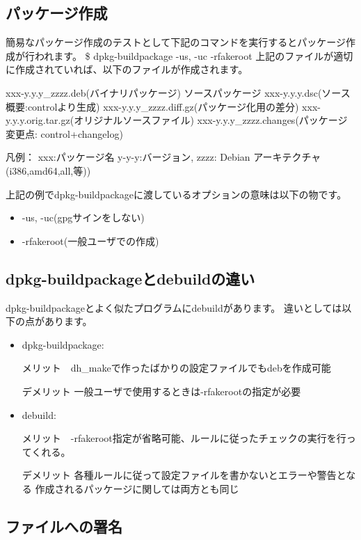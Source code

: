 \documentclass[mingoth,a4paper]{jsarticle}
\begin{document}
\subsection{パッケージ作成}

簡易なパッケージ作成のテストとして下記のコマンドを実行するとパッケージ作成が行われます。
\$ dpkg-buildpackage  -us, -uc  -rfakeroot
上記のファイルが適切に作成されていれば、以下のファイルが作成されます。
\begin{commandline}
 xxx-y.y.y_zzzz.deb(バイナリパッケージ)
 ソースパッケージ
 xxx-y.y.y.dsc(ソース概要:controlより生成)
 xxx-y.y.y_zzzz.diff.gz(パッケージ化用の差分)
 xxx-y.y.y.orig.tar.gz(オリジナルソースファイル)
 xxx-y.y.y_zzzz.changes(パッケージ変更点: control+changelog)

凡例： 
	xxx:パッケージ名
	y-y-y:バージョン,
	zzzz: Debian アーキテクチャ(i386,amd64,all,等))
\end{commandline}

上記の例でdpkg-buildpackageに渡しているオプションの意味は以下の物です。
\begin{itemize}
 \item  -us, -uc(gpgサインをしない)
 \item  -rfakeroot(一般ユーザでの作成)
\end{itemize}


\subsection{dpkg-buildpackageとdebuildの違い}

dpkg-buildpackageとよく似たプログラムにdebuildがあります。
違いとしては以下の点があります。

\begin{itemize}
 \item  dpkg-buildpackage:

 メリット　dh\_makeで作ったばかりの設定ファイルでもdebを作成可能

 デメリット 一般ユーザで使用するときは-rfakerootの指定が必要
 \item  debuild:

 メリット　-rfakeroot指定が省略可能、ルールに従ったチェックの実行を行っ
	てくれる。

 デメリット 各種ルールに従って設定ファイルを書かないとエラーや警告となる
 作成されるパッケージに関しては両方とも同じ
\end{itemize}


\subsection{ファイルへの署名}
\end{document}
